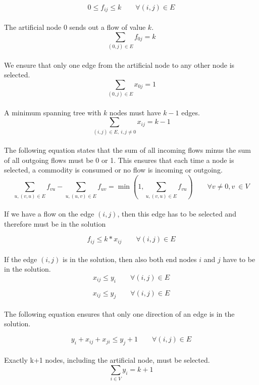 \begin{equation}
  0 \leq f_{ij} \leq k \qquad \forall (i,j) \in E
\end{equation}
\\
The artificial node $0$ sends out a flow of value $k$.
\begin{equation}
  \sum_{(0,j) \in E} f_{0j} = k 
\end{equation}
\\
We ensure that only one edge from the artificial node to any
other node is selected.
\begin{equation}
  \sum_{(0,j) \in E} x_{0j} = 1 
\end{equation}
\\
A minimum spanning tree with $k$ nodes must have $k-1$ edges.
\begin{equation}
  \sum_{(i,j) \in E, \ i,j \not =  0} x_{ij} = k-1 
\end{equation}
\\
The following equation states that the sum of all incoming flows minus the sum of all outgoing flows must be 0 or 1. This ensures that each time a node is selected, a commodity is consumed or no flow is incoming or outgoing.
\begin{equation}
  \sum_{u, (v,u) \in E} f_{vu} - \sum_{u, (u,v) \in E} f_{uv} = \min (1, \sum_{u, (v,u) \in E} f_{vu}) \qquad  \forall v \not = 0, v \ \in V
\end{equation}
\\
If we have a flow on the edge $(i,j)$, then this edge has to be selected and therefore must be in the solution

\begin{equation}
  f_{ij} \leq k * x_{ij} \qquad \forall (i,j) \in E 
\end{equation}
\\
If the edge $(i,j)$ is in the solution, then also both end nodes $i$ and $j$ 
have to be in the solution.
\begin{equation}
  x_{ij} \leq y_{i} \qquad \forall (i,j) \in E
  \label{lbl:xy1}
\end{equation}

\begin{equation}
  x_{ij} \leq y_{j} \qquad \forall (i,j) \in E
  \label{lbl:xy2}
\end{equation}
\\
The following equation ensures that only one direction of an edge is in the solution.

\begin{equation}
 y_{i} + x_{ij} + x_{ji} \leq y_{j} + 1 \qquad \forall (i,j) \in E
 \label{lbl:xy3}
\end{equation}
\\
Exactly k+1 nodes, including the artificial node, must be selected.
\begin{equation}
  \sum_{i \in V} y_i = k + 1
  \label{lbl:yk}
\end{equation}


